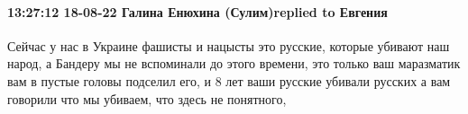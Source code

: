  
 
 
 
 

\paragraph{13:27:12 18-08-22 Галина Енюхина (Сулим)replied to Евгения}

Сейчас у нас в Украине фашисты и нацысты это русские, которые убивают наш
народ, а Бандеру мы не вспоминали до этого времени, это только ваш маразматик
вам в пустые головы подселил его, и 8 лет ваши русские убивали русских а вам
говорили что мы убиваем, что здесь не понятного,
